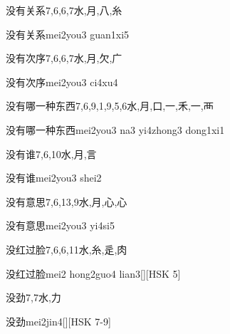 \begin{Entry}{没有关系}{7,6,6,7}{⽔,⽉,⼋,⽷}
  \begin{Phonetics}{没有关系}{mei2you3 guan1xi5}
  \end{Phonetics}
\end{Entry}

\begin{Entry}{没有次序}{7,6,6,7}{⽔,⽉,⽋,⼴}
  \begin{Phonetics}{没有次序}{mei2you3 ci4xu4}
  \end{Phonetics}
\end{Entry}

\begin{Entry}{没有哪一种东西}{7,6,9,1,9,5,6}{⽔,⽉,⼝,⼀,⽲,⼀,⾑}
  \begin{Phonetics}{没有哪一种东西}{mei2you3 na3 yi4zhong3 dong1xi1}
  \end{Phonetics}
\end{Entry}

\begin{Entry}{没有谁}{7,6,10}{⽔,⽉,⾔}
  \begin{Phonetics}{没有谁}{mei2you3 shei2}
  \end{Phonetics}
\end{Entry}

\begin{Entry}{没有意思}{7,6,13,9}{⽔,⽉,⼼,⼼}
  \begin{Phonetics}{没有意思}{mei2you3 yi4si5}
  \end{Phonetics}
\end{Entry}

\begin{Entry}{没红过脸}{7,6,6,11}{⽔,⽷,⾡,⾁}
  \begin{Phonetics}{没红过脸}{mei2 hong2guo4 lian3}[][HSK 5]
  \end{Phonetics}
\end{Entry}

\begin{Entry}{没劲}{7,7}{⽔,⼒}
  \begin{Phonetics}{没劲}{mei2jin4}[][HSK 7-9]
  \end{Phonetics}
\end{Entry}

